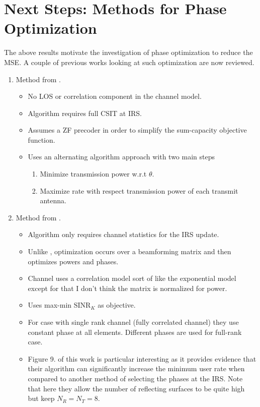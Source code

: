 \documentclass[12pt,a4paper]{report}
\begin{document}
\section{Next Steps: Methods for Phase Optimization}
The above results motivate the investigation of phase optimization to reduce the MSE. A couple of previous works looking at such optimization are now reviewed. 
\begin{enumerate}
\item
	Method from \cite{huang2018achievable}.
\begin{itemize}
\item
	No LOS or correlation component in the channel model.
\item
	Algorithm requires full CSIT at IRS.
\item 
	Assumes a ZF precoder in order to simplify the sum-capacity objective function.
\item
	Uses an alternating algorithm approach with two main steps
	\begin{enumerate}
	\item 
		Minimize transmission power w.r.t $\theta$.
	\item
		Maximize rate with respect transmission power of each transmit antenna.
	\end{enumerate}
\end{itemize}

\item 
	Method from \cite{kammoun2020asymptotic}.
	\begin{itemize}
		\item 
			Algorithm only requires channel statistics for the IRS update.
		\item
			Unlike \cite{huang2018achievable}, optimization occurs over a beamforming matrix and then optimizes powers and phases. 
		\item
			Channel uses a correlation model sort of like the exponential model except for that I don't think the matrix is normalized for power.
		\item
			Uses max-min $\text{SINR}_K$ as objective.
		\item
			For case with single rank channel (fully correlated channel) they use constant phase at all elements. Different phases are used for full-rank case.
		\item 
			Figure 9. of this work is particular interesting as it provides evidence that their algorithm can significantly increase the minimum user rate when compared
			to another method of selecting the phases at the IRS. Note that here they allow the number of reflecting surfaces to be quite high but keep $N_R = N_T = 8$.
	\end{itemize}
\end{enumerate}
\end{document}
